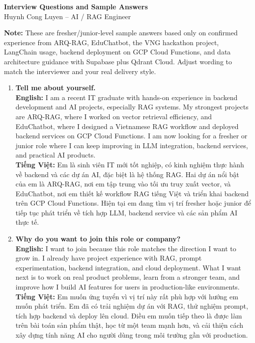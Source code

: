 \documentclass[11pt,a4paper]{article}
\begin{document}
{\LARGE \textbf{Interview Questions and Sample Answers}}\\
{\large Huynh Cong Luyen -- AI / RAG Engineer}

\vspace{8pt}
\textbf{Note:} These are fresher/junior-level sample answers based only on confirmed experience from ARQ-RAG, EduChatbot, the VNG hackathon project, LangChain usage, backend deployment on GCP Cloud Functions, and data architecture guidance with Supabase plus Qdrant Cloud. Adjust wording to match the interviewer and your real delivery style.

\begin{enumerate}[leftmargin=*, itemsep=10pt]

\item \textbf{Tell me about yourself.}\\
\textbf{English:} I am a recent IT graduate with hands-on experience in backend development and AI projects, especially RAG systems. My strongest projects are ARQ-RAG, where I worked on vector retrieval efficiency, and EduChatbot, where I designed a Vietnamese RAG workflow and deployed backend services on GCP Cloud Functions. I am now looking for a fresher or junior role where I can keep improving in LLM integration, backend services, and practical AI products.\\
\textbf{Tiếng Việt:} Em là sinh viên IT mới tốt nghiệp, có kinh nghiệm thực hành về backend và các dự án AI, đặc biệt là hệ thống RAG. Hai dự án nổi bật của em là ARQ-RAG, nơi em tập trung vào tối ưu truy xuất vector, và EduChatbot, nơi em thiết kế workflow RAG tiếng Việt và triển khai backend trên GCP Cloud Functions. Hiện tại em đang tìm vị trí fresher hoặc junior để tiếp tục phát triển về tích hợp LLM, backend service và các sản phẩm AI thực tế.

\item \textbf{Why do you want to join this role or company?}\\
\textbf{English:} I want to join because this role matches the direction I want to grow in. I already have project experience with RAG, prompt experimentation, backend integration, and cloud deployment. What I want next is to work on real product problems, learn from a stronger team, and improve how I build AI features for users in production-like environments.\\
\textbf{Tiếng Việt:} Em muốn ứng tuyển vì vị trí này rất phù hợp với hướng em muốn phát triển. Em đã có trải nghiệm dự án với RAG, thử nghiệm prompt, tích hợp backend và deploy lên cloud. Điều em muốn tiếp theo là được làm trên bài toán sản phẩm thật, học từ một team mạnh hơn, và cải thiện cách xây dựng tính năng AI cho người dùng trong môi trường gần với production.


\end{enumerate}
\end{document}
